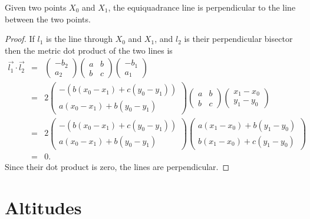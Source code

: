 \begin{theorem}Given two points $X_0$ and $X_1$, the equiquadrance line is perpendicular to the line between the two points.
\end{theorem}
\begin{proof}
If $l_1$ is the line through $X_0$ and $X_1$, and $l_2$ is their perpendicular bisector then the metric dot product of the two lines is
\begin{eqnarray*}
\vec{l_1}\cdot\vec{l_2} & = & \begin{pmatrix}-b_2 \\ a_2\end{pmatrix}\begin{pmatrix}a & b \\ b & c\end{pmatrix}\begin{pmatrix}-b_1 \\ a_1\end{pmatrix}\\
                        & = & 2\begin{pmatrix}-(b(x_0 - x_1) + c(y_0 - y_1)) \\ a(x_0 - x_1) + b(y_0 - y_1)\end{pmatrix}\begin{pmatrix}a & b \\ b & c\end{pmatrix}\begin{pmatrix}x_1 - x_0 \\ y_1 - y_0\end{pmatrix}\\
                        & = & 2\begin{pmatrix}-(b(x_0 - x_1) + c(y_0 - y_1)) \\ a(x_0 - x_1) + b(y_0 - y_1)\end{pmatrix}\begin{pmatrix}a(x_1 - x_0) + b(y_1 - y_0) \\ b(x_1 - x_0) + c(y_1 - y_0)\end{pmatrix}\\
 & = & 0.
\end{eqnarray*}
Since their dot product is zero, the lines are perpendicular.
\end{proof}

\section{Altitudes}

